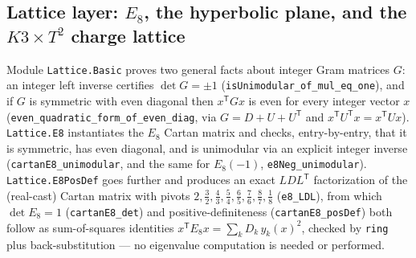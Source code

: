 \documentclass[11pt,a4paper]{article}
\theoremstyle{remark}
\begin{document}
\subsection{Lattice layer: \texorpdfstring{$E_8$}{E8}, the hyperbolic plane, and the \texorpdfstring{$K3\times T^2$}{K3xT2} charge lattice}
\label{sec:stream2-lattice}
Module \texttt{Lattice.Basic} proves two general facts about integer Gram matrices $G$: an integer
left inverse certifies $\det G=\pm1$ (\texttt{isUnimodular\_\discretionary{}{}{}of\_\discretionary{}{}{}mul\_\discretionary{}{}{}eq\_\discretionary{}{}{}one}),
and if $G$ is symmetric with even diagonal then $x^{\mathsf T}Gx$ is even for every integer vector
$x$ (\texttt{even\_\discretionary{}{}{}quadratic\_\discretionary{}{}{}form\_\discretionary{}{}{}of\_\discretionary{}{}{}even\_\discretionary{}{}{}diag},
via $G=D+U+U^{\mathsf T}$ and $x^{\mathsf T}U^{\mathsf T}x=x^{\mathsf T}Ux$). \texttt{Lattice.E8}
instantiates the $E_8$ Cartan matrix and checks, entry-by-entry, that it is symmetric, has even
diagonal, and is unimodular via an explicit integer inverse
(\texttt{cartanE8\_\discretionary{}{}{}unimodular}, and the same for $E_8(-1)$,
\texttt{e8Neg\_\discretionary{}{}{}unimodular}). \texttt{Lattice.E8PosDef} goes further and produces
an exact $LDL^{\mathsf T}$ factorization of the (real-cast) Cartan matrix with pivots $2,\tfrac32,
\tfrac43,\tfrac54,\tfrac65,\tfrac76,\tfrac87,\tfrac18$ (\texttt{e8\_\discretionary{}{}{}LDL}), from
which $\det E_8=1$ (\texttt{cartanE8\_\discretionary{}{}{}det}) and positive-definiteness
(\texttt{cartanE8\_\discretionary{}{}{}posDef}) both follow as sum-of-squares identities
$x^{\mathsf T}E_8x=\sum_k D_k\,y_k(x)^2$, checked by \texttt{ring} plus back-substitution --- no
eigenvalue computation is needed or performed.
\end{document}
